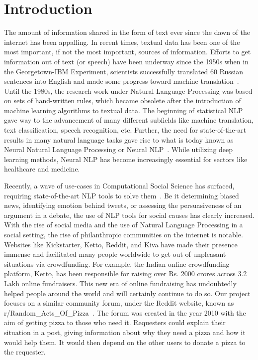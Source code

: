 \documentclass[runningheads]{llncs}
\begin{document}
\section{Introduction}
The amount of information shared in the form of text ever since the dawn of the internet has been appalling. In recent times, textual data has been one of the most important, if not the most important, sources of information. Efforts to get information out of text (or speech) have been underway since the 1950s when in the Georgetown-IBM Experiment, scientists successfully translated 60 Russian sentences into English and made some progress toward machine translation~\cite{gtown_exp}. Until the 1980s, the research work under Natural Language Processing was based on sets of hand-written rules, which became obsolete after the introduction of machine learning algorithms to textual data. The beginning of statistical NLP gave way to the advancement of many different subfields like machine translation, text classification, speech recognition, etc. Further, the need for state-of-the-art results in many natural language tasks gave rise to what is today known as Neural Natural Language Processing or Neural NLP~\cite{neural_nlp}. While utilizing deep learning methods, Neural NLP has become increasingly essential for sectors like healthcare and medicine.

Recently, a wave of use-cases in Computational Social Science has surfaced, requiring state-of-the-art NLP tools to solve them~\cite{compsci_nlp}. Be it determining biased news, identifying emotion behind tweets, or assessing the persuasiveness of an argument in a debate, the use of NLP tools for social causes has clearly increased. With the rise of social media and the use of Natural Language Processing in a social setting, the rise of philanthropic communities on the internet is notable. Websites like Kickstarter, Ketto, Reddit, and Kiva have made their presence immense and facilitated many people worldwide to get out of unpleasant situations via crowdfunding. For example, the Indian online crowdfunding platform, Ketto, has been responsible for raising over Rs. 2000 crores across 3.2 Lakh online fundraisers. This new era of online fundraising has undoubtedly helped people around the world and will certainly continue to do so. Our project focuses on a similar community forum, under the Reddit website, known as r/Random\_Acts\_Of\_Pizza~\cite{raop_paper}. The forum was created in the year 2010 with the aim of getting pizza to those who need it. Requesters could explain their situation in a post, giving information about why they need a pizza and how it would help them. It would then depend on the other users to donate a pizza to the requester.
\end{document}
